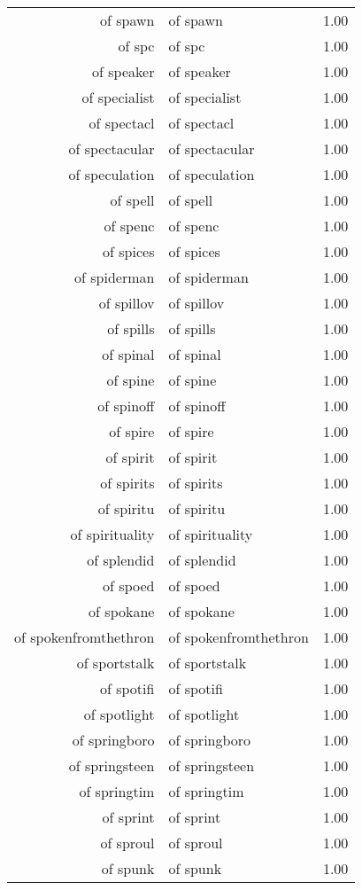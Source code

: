 \begin{table}[ht]
\begin{tabular}{rlr}
  of spawn & of spawn & 1.00 \\ 
  of spc & of spc & 1.00 \\ 
  of speaker & of speaker & 1.00 \\ 
  of specialist & of specialist & 1.00 \\ 
  of spectacl & of spectacl & 1.00 \\ 
  of spectacular & of spectacular & 1.00 \\ 
  of speculation & of speculation & 1.00 \\ 
  of spell & of spell & 1.00 \\ 
  of spenc & of spenc & 1.00 \\ 
  of spices & of spices & 1.00 \\ 
  of spiderman & of spiderman & 1.00 \\ 
  of spillov & of spillov & 1.00 \\ 
  of spills & of spills & 1.00 \\ 
  of spinal & of spinal & 1.00 \\ 
  of spine & of spine & 1.00 \\ 
  of spinoff & of spinoff & 1.00 \\ 
  of spire & of spire & 1.00 \\ 
  of spirit & of spirit & 1.00 \\ 
  of spirits & of spirits & 1.00 \\ 
  of spiritu & of spiritu & 1.00 \\ 
  of spirituality & of spirituality & 1.00 \\ 
  of splendid & of splendid & 1.00 \\ 
  of spoed & of spoed & 1.00 \\ 
  of spokane & of spokane & 1.00 \\ 
  of spokenfromthethron & of spokenfromthethron & 1.00 \\ 
  of sportstalk & of sportstalk & 1.00 \\ 
  of spotifi & of spotifi & 1.00 \\ 
  of spotlight & of spotlight & 1.00 \\ 
  of springboro & of springboro & 1.00 \\ 
  of springsteen & of springsteen & 1.00 \\ 
  of springtim & of springtim & 1.00 \\ 
  of sprint & of sprint & 1.00 \\ 
  of sproul & of sproul & 1.00 \\ 
  of spunk & of spunk & 1.00 \\ 

\end{tabular}
\end{table}
